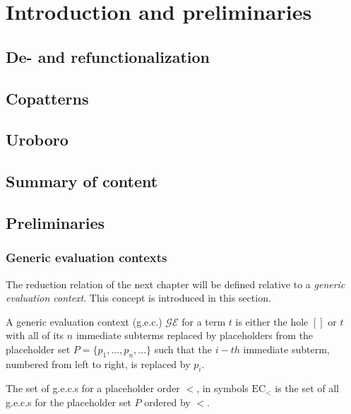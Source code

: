 \chapter{Introduction and preliminaries}

\section{De- and refunctionalization}

\section{Copatterns}

\section{Uroboro}

\section{Summary of content}

\section{Preliminaries}

\subsection{Generic evaluation contexts}

The reduction relation of the next chapter will be defined relative to a \textit{generic evaluation context}. This concept is introduced in this section.

\begin{definition}
A generic evaluation context (g.e.c.) $\mathcal{GE}$ for a term $t$ is either the hole $[]$ or $t$ with all of its $n$ immediate subterms replaced by placeholders from the placeholder set $P = \{p_1, ..., p_n, ...\}$ such that the $i-th$ immediate subterm, numbered from left to right, is replaced by $p_i$.
\end{definition}

\begin{definition}
The set of g.e.c.s for a placeholder order $<$, in symbols $\textrm{EC}_<$ is the set of all g.e.c.s for the placeholder set $P$ ordered by $<$.
\end{definition}

